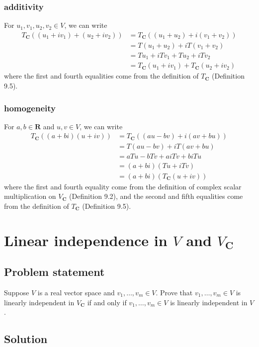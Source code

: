 \documentclass{article}
\begin{document}
\subsubsection*{additivity}
For $u_1,v_1,u_2,v_2\in V$, we can write
\begin{align*}
    T_{\mathbf{C}}((u_1+iv_1)+(u_2+iv_2))&=T_{\mathbf{C}}((u_1+u_2)+i(v_1+v_2))\\
    &=T(u_1+u_2)+iT(v_1+v_2)\\
    &=Tu_1+iTv_1+Tu_2+iTv_2\\
    &=T_{\mathbf{C}}(u_1+iv_1)+T_{\mathbf{C}}(u_2+iv_2)
\end{align*}
where the first and fourth equalities come from the definition of $T_{\mathbf{C}}$ (Definition 9.5).

\subsubsection*{homogeneity}
For $a,b\in\mathbf{R}$ and $u,v\in V$, we can write
\begin{align*}
    T_{\mathbf{C}}((a+bi)(u+iv))&=T_{\mathbf{C}}((au-bv)+i(av+bu))\\
    &=T(au-bv)+iT(av+bu)\\
    &=aTu-bTv+aiTv+biTu\\
    &=(a+bi)(Tu+iTv)\\
    &=(a+bi)(T_{\mathbf{C}}(u+iv))
\end{align*}
where the first and fourth equality come from the definition of complex scalar multiplication on $V_{\mathbf{C}}$ (Definition 9.2), and the second and fifth equalities come from the definition of $T_{\mathbf{C}}$ (Definition 9.5).

\clearpage

\section{Linear independence in $V$ and $V_{\mathbf{C}}$}
\subsection*{Problem statement}
Suppose $V$ is a real vector space and $v_1,\ldots,v_m\in V$. 
Prove that $v_1,\ldots,v_m\in V$ is linearly independent in $V_{\mathbf{C}}$ if and only if $v_1,\ldots,v_m\in V$ is linearly independent in $V$.

\subsection*{Solution}
\end{document}
